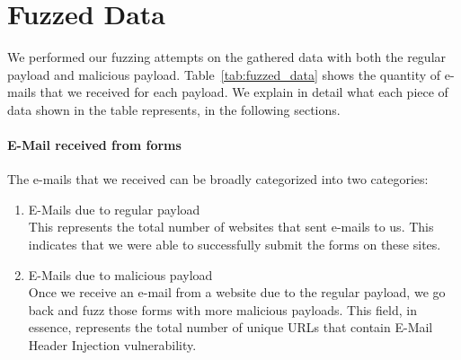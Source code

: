 \section{Fuzzed Data}
We performed our fuzzing attempts on the gathered data with both the regular payload and malicious payload. Table~\ref{tab:fuzzed_data} shows the quantity of e-mails that we received for each payload. We explain in detail what each piece of data shown in the table represents, in the following sections.

\paragraph{E-Mail received from forms}
The e-mails that we received can be broadly categorized into two categories:
\begin{enumerate}
	\item E-Mails due to regular payload\\
	This represents the total number of websites that sent e-mails to us. This indicates that we were able to successfully submit the forms on these sites.
	
	\item E-Mails due to malicious payload\\
    Once we receive an e-mail from a website due to the regular payload, we go back and fuzz those forms with more malicious payloads. This field, in essence, represents the total number of unique URLs that contain E-Mail Header Injection vulnerability.
\end{enumerate}



